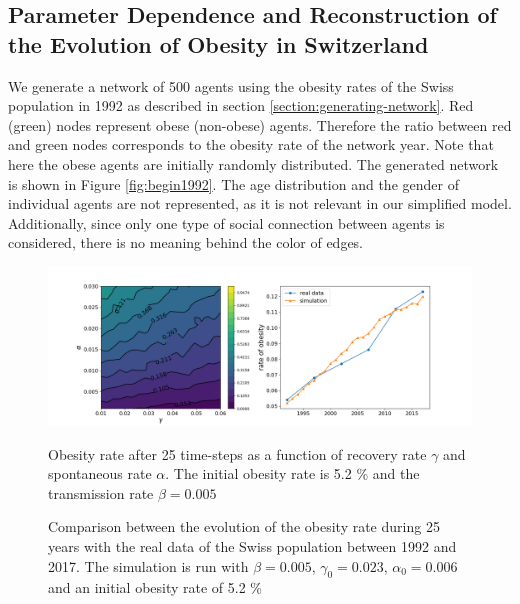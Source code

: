\documentclass[11pt]{article}
\begin{document}
\FloatBarrier

\subsection{Parameter Dependence and Reconstruction of the Evolution of Obesity in Switzerland}

We generate a network of 500 agents using the obesity rates of the Swiss population in 1992 \cite{bmistatistics} as described in section \ref{section:generating-network}. Red (green) nodes represent obese (non-obese) agents. Therefore the ratio between red and green nodes corresponds to the obesity rate of the network year. Note that here the obese agents are initially randomly distributed.
The generated network is shown in Figure \ref{fig:begin1992}. The age distribution and the gender of individual agents are not represented, as it is not relevant in our simplified model. Additionally, since only one type of social connection between agents is considered, there is no meaning behind the color of edges. \\

\begin{figure}[!htb]
    \centering
    \includegraphics[width=\linewidth]{figures/parameters-25y.png}
\begin{minipage}[t]{.45\linewidth}
    \caption{\label{fig:parameters-25y} Obesity rate after 25 time-steps as a function of recovery rate $\gamma$ and spontaneous rate $\alpha$. The initial obesity rate is 5.2 \% and the transmission rate $\beta=0.005$}
\end{minipage}%
\hfill%
\begin{minipage}[t]{.45\linewidth}
    \caption{\label{fig:comparison} Comparison between the evolution of the obesity rate during 25 years with the real data of the Swiss population between 1992 and 2017. The simulation is run with $\beta = 0.005 $, $\gamma_0 = 0.023$, $\alpha_0 = 0.006$ and an initial obesity rate of 5.2 \%}
\end{minipage}%
\end{figure}
\end{document}
